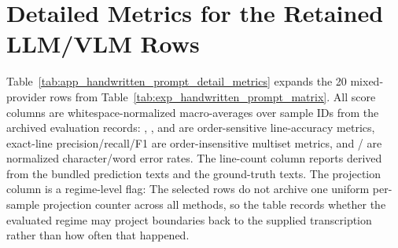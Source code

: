 \FloatBarrier

\section{Detailed Metrics for the Retained LLM/VLM Rows}
\label{sec:appendix_prompt_detail_metrics}

Table~\ref{tab:app_handwritten_prompt_detail_metrics} expands the 20 mixed-provider rows from Table~\ref{tab:exp_handwritten_prompt_matrix}. All score columns are whitespace-normalized macro-averages over sample IDs from the archived evaluation records: \LANormForward{}, \LANormReverse{}, and \LANormCombined{} are order-sensitive line-accuracy metrics, exact-line precision/recall/F1 are order-insensitive multiset metrics, and \CERNorm{}/\WERNorm{} are normalized character/word error rates. The line-count column reports \MeanAbsLineDelta{} derived from the bundled prediction texts and the ground-truth texts. The projection column is a regime-level flag: The selected rows do not archive one uniform per-sample projection counter across all methods, so the table records whether the evaluated regime may project boundaries back to the supplied transcription rather than how often that happened.


